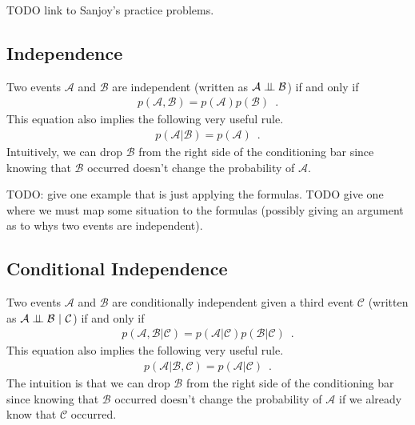 \documentclass{tufte-handout}
\begin{document}
\begin{exercise}
TODO link to Sanjoy's practice problems.
\end{exercise}


\subsection{Independence}

Two events $\mathcal{A}$ and $\mathcal{B}$ are independent (written as $\mathcal{A} \perp\!\!\!\perp \mathcal{B}$) if and only if
\begin{align}
p(\mathcal{A}, \mathcal{B}) = p(\mathcal{A}) p(\mathcal{B}) \enspace .
\end{align}
This equation also implies the following very useful rule.
\begin{align}
p(\mathcal{A} | \mathcal{B}) = p(\mathcal{A}) \enspace .
\end{align}
Intuitively, we can drop $\mathcal{B}$ from the right side of the conditioning bar since knowing that $\mathcal{B}$ occurred doesn't change the probability of $\mathcal{A}$.

\begin{exercise}
TODO: give one example that is just applying the formulas.  TODO give one where we must map some situation to the formulas (possibly giving an argument as to whys two events are independent).
\end{exercise}

\subsection{Conditional Independence}


Two events $\mathcal{A}$ and $\mathcal{B}$ are conditionally independent given a third event $\mathcal{C}$ (written as $\mathcal{A} \perp\!\!\!\perp \mathcal{B}~|~\mathcal{C}$) if and only if
\begin{align}
p(\mathcal{A}, \mathcal{B} | \mathcal{C}) = p(\mathcal{A} | \mathcal{C}) p(\mathcal{B} | \mathcal{C}) \enspace .
\end{align}
This equation also implies the following very useful rule.
\begin{align}
p(\mathcal{A} | \mathcal{B}, \mathcal{C}) = p(\mathcal{A} | \mathcal{C}) \enspace .
\end{align}
The intuition is that we can drop $\mathcal{B}$ from the right side of the conditioning bar since knowing that $\mathcal{B}$ occurred doesn't change the probability of $\mathcal{A}$ if we already know that $\mathcal{C}$ occurred.
\end{document}
